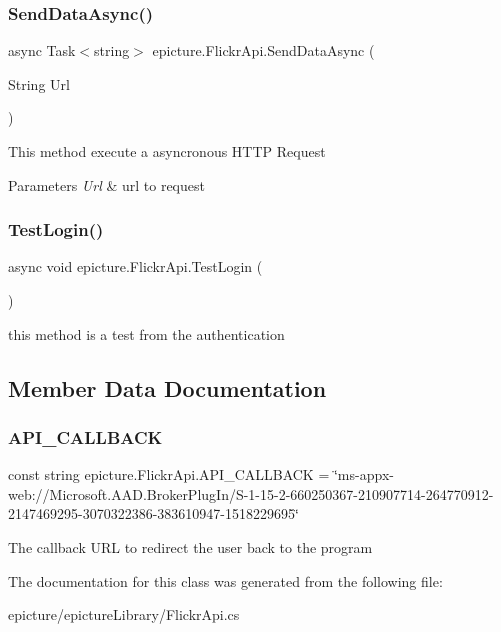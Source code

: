 \subsubsection{\texorpdfstring{Send\+Data\+Async()}{SendDataAsync()}}
{\footnotesize\ttfamily async Task$<$string$>$ epicture.\+Flickr\+Api.\+Send\+Data\+Async (\begin{DoxyParamCaption}\item[{String}]{Url }\end{DoxyParamCaption})\hspace{0.3cm}{\ttfamily [private]}}

This method execute a asyncronous H\+T\+TP Request 
\begin{DoxyParams}{Parameters}
{\em Url} & url to request \\
\hline
\end{DoxyParams}
\mbox{\label{classepicture_1_1_flickr_api_a4e39f3d53b58577718284c284c34338b}} 
\subsubsection{\texorpdfstring{Test\+Login()}{TestLogin()}}
{\footnotesize\ttfamily async void epicture.\+Flickr\+Api.\+Test\+Login (\begin{DoxyParamCaption}{ }\end{DoxyParamCaption})}

this method is a test from the authentication 

\subsection{Member Data Documentation}
\mbox{\label{classepicture_1_1_flickr_api_aa2d58a7bd6de20766896ad0b717100bb}} 
\subsubsection{\texorpdfstring{A\+P\+I\+\_\+\+C\+A\+L\+L\+B\+A\+CK}{API\_CALLBACK}}
{\footnotesize\ttfamily const string epicture.\+Flickr\+Api.\+A\+P\+I\+\_\+\+C\+A\+L\+L\+B\+A\+CK = \char`\"{}ms-\/appx-\/web\+://Microsoft.\+A\+A\+D.\+Broker\+Plug\+In/S-\/1-\/15-\/2-\/660250367-\/210907714-\/264770912-\/2147469295-\/3070322386-\/383610947-\/1518229695\char`\"{}\hspace{0.3cm}{\ttfamily [private]}}

The callback U\+RL to redirect the user back to the program 

The documentation for this class was generated from the following file\+:\begin{DoxyCompactItemize}
\item 
epicture/epicture\+Library/Flickr\+Api.\+cs\end{DoxyCompactItemize}

